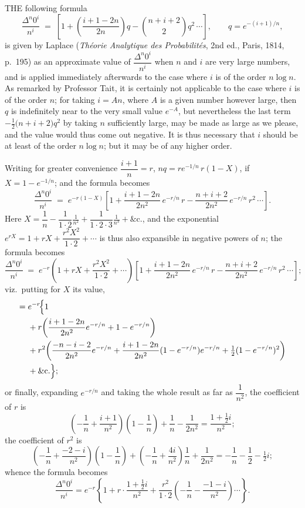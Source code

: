 \documentclass[11pt]{article}
\begin{document}

\medskip

\noindent THE following formula
\[
\frac{\Delta^n 0^i}{n^i} \;=\; \left[1+\!\left(\frac{i+1-2n}{2n}\right)\!q - \!\binom{n+i+2}{2}\!q^2\,\cdots\right],\qquad q = e^{-(i+1)/n},
\]
is given by Laplace (\textit{Th\'eorie Analytique des Probabilit\'es}, 2nd ed., Paris, 1814, p.~195) as an approximate value of $\dfrac{\Delta^n 0^i}{n^i}$ when $n$ and $i$ are very large numbers, and is applied immediately afterwards to the case where $i$ is of the order $n\log n$. As remarked by Professor Tait, it is certainly not applicable to the case where $i$ is of the order $n$; for taking $i=An$, where $A$ is a given number however large, then $q$ is indefinitely near to the very small value $e^{-A}$, but nevertheless the last term $-\tfrac{1}{2}\bigl(n+i+2\bigr)q^2$ by taking $n$ sufficiently large, may be made as large as we please, and the value would thus come out negative. It is thus necessary that $i$ should be at least of the order $n\log n$; but it may be of any higher order.

\medskip

Writing for greater convenience $\dfrac{i+1}{n} = r$, $nq = re^{-1/n}\,r(1-X)$, if $X=1-e^{-1/n}$; and the formula becomes
\[
\frac{\Delta^n 0^i}{n^i} \;=\; e^{-r(1-X)}\!\left[1+\frac{i+1-2n}{2n^2}\,e^{-r/n}\,r - \frac{n+i+2}{2n^2}\,e^{-r/n}\,r^2\,\cdots\right].
\]
Here $X = \dfrac{1}{n} - \dfrac{1}{1\cdot 2}\frac{1}{n^2} + \dfrac{1}{1\cdot 2\cdot 3}\frac{1}{n^3} + \&\text{c.}$, and the exponential $e^{rX} = 1 + rX + \dfrac{r^2 X^2}{1\cdot 2} + \cdots$ is thus also expansible in negative powers of $n$; the formula becomes
\[
\frac{\Delta^n 0^i}{n^i} \;=\; e^{-r}\!\left(1 + rX + \frac{r^2X^2}{1\cdot 2}+\cdots\right)\!\left[1+\frac{i+1-2n}{2n^2}\,e^{-r/n}\,r - \frac{n+i+2}{2n^2}\,e^{-r/n}\,r^2\,\cdots\right];
\]
viz.\ putting for $X$ its value,
\begin{align*}
=\; & e^{-r}\!\Bigl\{1\\
& + r\!\left(\frac{i+1-2n}{2n^2}e^{-r/n}+1-e^{-r/n}\right)\\
& + r^2\!\left(\frac{-n-i-2}{2n^2}e^{-r/n}+\frac{i+1-2n}{2n^2}(1-e^{-r/n})e^{-r/n}+\tfrac{1}{2}(1-e^{-r/n})^2\right)\\
& + \&\text{c.}\Bigr\};
\end{align*}
or finally, expanding $e^{-r/n}$ and taking the whole result as far as $\dfrac{1}{n^2}$, the coefficient of $r$ is
\[
\left(-\frac{1}{n} + \frac{i+1}{n^2}\right)\!\left(1-\frac{1}{n}\right) + \frac{1}{n} - \frac{1}{2n^2} = \frac{1+\tfrac{1}{2}i}{n^2};
\]
the coefficient of $r^2$ is
\[
\left(-\frac{1}{n}+\frac{-2-i}{n^2}\right)\!\left(1-\frac{1}{n}\right)+\left(-\frac{1}{n}+\frac{4i}{n^2}\right)\frac{1}{n}+\frac{1}{2n^2}=-\frac{1}{n}-\frac{1}{2}-\tfrac{1}{2}i;
\]
whence the formula becomes
\[
\frac{\Delta^n 0^i}{n^i} = e^{-r}\!\left\{1 + r\cdot\frac{1+\tfrac{1}{2}i}{n^2} + \frac{r^2}{1\cdot 2}\!\left(-\frac{1}{n} - \frac{-1-i}{n^2}\right)\!\cdots\right\}.
\]
\end{document}

